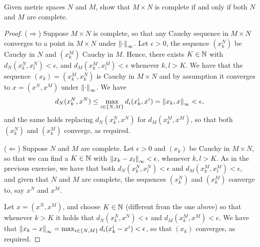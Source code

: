 \begin{exercise}{17}
Given metric spaces $N$ and $M$, show that $M\times N$ is complete if and only if both $N$ and $M$ are complete.
\end{exercise}
\begin{proof}
($\Rightarrow$)
Suppose $M\times N$ is complete, so that any Cauchy sequence in $M\times N$ converges to a point in $M\times N$ under $\left\lVert \cdot\right\rVert_\infty$.
Let $\epsilon>0$, the sequence $(x^N_k)$ be Cauchy in $N$ and $(x^M_k)$ Cauchy in $M$.
Hence, there exists $K\in\mathbb{N}$ with $d_N(x^N_k,x^N_l)<\epsilon$, and $d_M(x^M_k,x^M_l)<\epsilon$ whenever $k,l>K$.
We have that the sequence $(x_k) = (x^M_k,x^N_k)$ is Cauchy in $M\times N$ and by assumption it converges to $x=(x^N,x^M)$ under $\left\lVert \cdot\right\rVert_\infty$.
We have 
\begin{align*}
    d_N(x^N_k,x^N) \leq \max_{i\in\{N,M\}}d_i(x^i_k,x^i) = \left\lVert x_k,x\right\rVert_\infty < \epsilon,    
\end{align*}
and the same holds replacing $d_N(x^N_k,x^N)$ for $d_M(x^M_k,x^M)$, so that both $(x^N_k)$ and $(x^M_k)$ converge, as required.

($\Leftarrow$)
Suppose $N$ and $M$ are complete.
Let $\epsilon>0$ and $(x_k)$ be Cauchy in $M\times N$, so that we can find a $K\in\mathbb{N}$ with $\left\lVert x_k-x_l\right\rVert_\infty<\epsilon$, whenever $k,l>K$.
As in the previous exercise, we have that both $d_N(x^N_k, x^N_l)<\epsilon$ and $d_M(x^M_k, x^M_l)<\epsilon$, and given that $N$ and $M$ are complete, the sequences $(x^N_k)$ and $(x^M_k)$ converge to, say $x^N$ and $x^M$. 

Let $x=(x^N, x^M)$, and choose $K\in\mathbb{N}$ (different from the one above) so that whenever $k>K$ it holds that $d_N(x^N_k, x^N)<\epsilon$ and $d_M(x^M_k, x^M)<\epsilon$.
We have that $\left\lVert x_k-x\right\rVert_\infty = \max_{i\in \{N,M\}}d_i(x^i_k-x^i) < \epsilon$, so that $(x_k)$ converges, as required.
\end{proof} 

